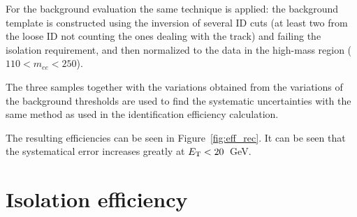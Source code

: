 For the background evaluation the same technique is applied: the background template is constructed using the inversion of several ID cuts (at least two from the loose ID not counting the ones dealing with the track) and failing the isolation requirement, and then normalized to the data in the high-mass region ($110 < m_{ee} < 250$).

The three samples together with the variations obtained from the variations of the background thresholds are used to find the systematic uncertainties with the same method as used in the identification efficiency calculation.

The resulting efficiencies can be seen in Figure~\ref{fig:eff_rec}. It can be seen that the systematical error increases greatly at $E_{\mathrm{T}} < 20$~GeV.

\begin{figure}
\end{figure}

\section{Isolation efficiency}

